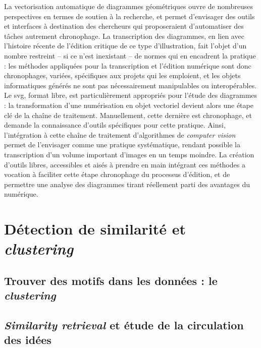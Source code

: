 \documentclass[a4paper,12pt,twoside]{book}
\newcommand{\cv}{\textit{computer vision}\xspace}
\newcommand{\svg}{\gls{svg}\xspace}
\newcommand{\clearemptydoublepage}{\newpage{\pagestyle{empty}\cleardoublepage}}
\begin{document}
        La vectorisation automatique de diagrammes géométriques ouvre de nombreuses perspectives en termes de soutien à la recherche, et permet d'envisager des outils et interfaces à destination des chercheurs qui proposeraient d'automatiser des tâches autrement chronophage. La transcription des diagrammes, en lien avec l'histoire récente de l'édition critique de ce type d'illustration, fait l'objet d'un nombre restreint -- si ce n'est inexistant -- de normes qui en encadrent la pratique : les méthodes appliquées pour la transcription et l'édition numérique sont donc chronophages, variées, spécifiques aux projets qui les emploient, et les objets informatiques générés ne sont pas nécessairement manipulables ou interopérables. Le \svg, format libre, est particulièrement appropriés pour l'étude des diagrammes : la transformation d'une numérisation en objet vectoriel devient alors une étape clé de la chaîne de traitement. Manuellement, cette dernière est chronophage, et demande la connaissance d'outils spécifiques pour cette pratique. Ainsi, l'intégration à cette chaîne de traitement d'algorithmes de \cv permet de l'envisager comme une pratique systématique, rendant possible la transcription d'un volume important d'images en un temps moindre. La création d'outils libres, accessibles et aisés à prendre en main intégrant ces méthodes a vocation à faciliter cette étape chronophage du processus d'édition, et de permettre une analyse des diagrammes tirant réellement parti des avantages du numérique.    
        \clearemptydoublepage
        
        \chapter{Détection de similarité et \textit{clustering}}
	             \section{Trouver des motifs dans les données : le \textit{clustering}}
        			
        			
                \section{\textit{Similarity retrieval} et étude de la circulation des idées}
                    
            
        \clearemptydoublepage
    
\end{document}
